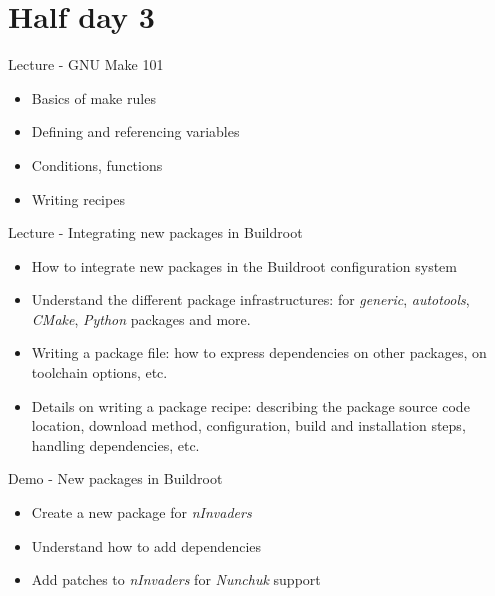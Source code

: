 \documentclass[a4paper,12pt,obeyspaces,spaces,hyphens]{article}
\begin{document}
\section{Half day 3}

\feagendaonecolumn
{Lecture - GNU Make 101}
{
  \begin{itemize}
  \item Basics of make rules
  \item Defining and referencing variables
  \item Conditions, functions
  \item Writing recipes
  \end{itemize}
}

\feagendatwocolumn
{Lecture - Integrating new packages in Buildroot}
{
  \begin{itemize}
  \item How to integrate new packages in the Buildroot configuration
    system
  \item Understand the different package infrastructures: for {\em
      generic}, {\em autotools}, {\em CMake}, {\em Python} packages
    and more.
  \item Writing a package  file: how to express
    dependencies on other packages, on toolchain options, etc.
  \item Details on writing a package recipe: describing the package
    source code location, download method, configuration, build and
    installation steps, handling dependencies, etc.
  \end{itemize}
}
{Demo - New packages in Buildroot}
{
  \begin{itemize}
  \item Create a new package for {\em nInvaders}
  \item Understand how to add dependencies
  \item Add patches to {\em nInvaders} for {\em Nunchuk} support
  \end{itemize}
}
\end{document}
